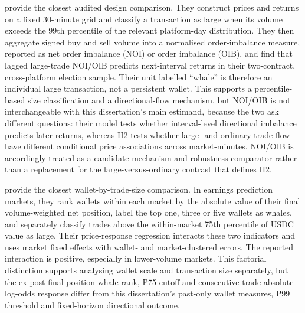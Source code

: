 \citet{ng2026pricediscovery} provide the closest audited design comparison. They construct prices and returns on a fixed 30-minute grid and classify a transaction as large when its volume exceeds the 99th percentile of the relevant platform-day distribution. They then aggregate signed buy and sell volume into a normalised order-imbalance measure, reported as net order imbalance (NOI) or order imbalance (OIB), and find that lagged large-trade NOI/OIB predicts next-interval returns in their two-contract, cross-platform election sample. Their unit labelled ``whale'' is therefore an individual large transaction, not a persistent wallet. This supports a percentile-based size classification and a directional-flow mechanism, but NOI/OIB is not interchangeable with this dissertation's main estimand, because the two ask different questions: their model tests whether interval-level directional imbalance predicts later returns, whereas H2 tests whether large- and ordinary-trade flow have different conditional price associations across market-minutes. NOI/OIB is accordingly treated as a candidate mechanism and robustness comparator rather than a replacement for the large-versus-ordinary contrast that defines H2.

\citet{cheongtamayo2026concentrated} provide the closest wallet-by-trade-size comparison. In earnings prediction markets, they rank wallets within each market by the absolute value of their final volume-weighted net position, label the top one, three or five wallets as whales, and separately classify trades above the within-market 75th percentile of USDC value as large. Their price-response regression interacts these two indicators and uses market fixed effects with wallet- and market-clustered errors. The reported interaction is positive, especially in lower-volume markets. This factorial distinction supports analysing wallet scale and transaction size separately, but the ex-post final-position whale rank, P75 cutoff and consecutive-trade absolute log-odds response differ from this dissertation's past-only wallet measures, P99 threshold and fixed-horizon directional outcome.

